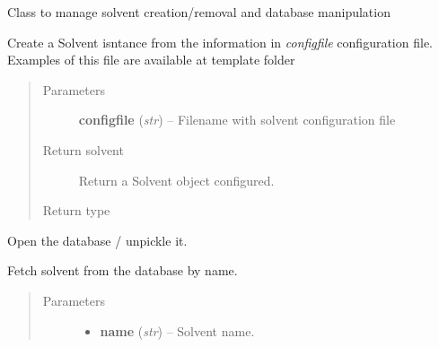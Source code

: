 \documentclass[letterpaper,10pt,english]{sphinxmanual}
\begin{document}
\begin{fulllineitems}
\label{solvents:pyMDMix.Solvents.SolventManager}
Class to manage solvent creation/removal and database manipulation

\begin{fulllineitems}
\label{solvents:pyMDMix.Solvents.SolventManager.createSolvent}
Create a Solvent isntance from the information in \emph{configfile} configuration file.
Examples of this file are available at template folder 
\begin{quote}\begin{description}
\item[{Parameters}] \leavevmode
\textbf{configfile} (\emph{str}) -- Filename with solvent configuration file

\item[{Return solvent}] \leavevmode
Return a Solvent object configured.

\item[{Return type}] \leavevmode
{\hyperref[solvents:pyMDMix.Solvents.Solvent]{}}

\end{description}\end{quote}

\end{fulllineitems}


\begin{fulllineitems}
\label{solvents:pyMDMix.Solvents.SolventManager.getDatabase}
Open the database / unpickle it.

\end{fulllineitems}


\begin{fulllineitems}
\label{solvents:pyMDMix.Solvents.SolventManager.getSolvent}
Fetch solvent from the database by name.
\begin{quote}\begin{description}
\item[{Parameters}] \leavevmode\begin{itemize}
\item {} 
\textbf{name} (\emph{str}) -- Solvent name.


\end{itemize}
\end{description}
\end{quote}
\end{fulllineitems}
\end{fulllineitems}
\end{document}
